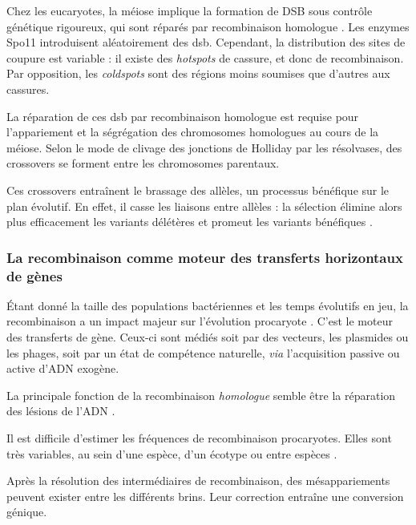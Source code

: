 \documentclass[11pt, oneside]{scrartcl}
\begin{document}
Chez les eucaryotes, la méiose implique la formation de DSB sous contrôle
génétique rigoureux, qui sont réparés par recombinaison homologue
\cite{chapman_playing_2012}. Les enzymes Spo11 introduisent aléatoirement des
\ac{dsb}. Cependant, la distribution des sites de coupure est variable : il
existe des \emph{hotspots} de cassure, et donc de recombinaison. Par opposition, les
\emph{coldspots} sont des régions moins soumises que d'autres aux cassures.

La réparation de ces \ac{dsb} par recombinaison homologue est requise pour
l'appariement et la ségrégation des chromosomes homologues au cours de la
méiose. Selon le mode de clivage des jonctions de Holliday par les résolvases,
des crossovers se forment entre les chromosomes parentaux. 

Ces crossovers entraînent le brassage des allèles, un processus bénéfique sur le
plan évolutif\cite{webster_direct_2012}. En effet, il casse les liaisons entre
allèles : la sélection élimine alors plus efficacement les variants délétères et
promeut les variants bénéfiques \cite{otto_resolving_2002}. 

\subsubsection{La recombinaison comme moteur des transferts horizontaux de gènes}
\label{sec:orgheadline5}

Étant donné la taille des populations bactériennes et les temps évolutifs en
jeu, la recombinaison a un impact majeur sur l'évolution procaryote
\cite{didelot_impact_2010}. C'est le moteur des transferts de gène. Ceux-ci sont
médiés soit par des vecteurs, les plasmides ou les phages, soit par un état de
compétence naturelle, \emph{via} l'acquisition passive ou active d'ADN exogène. 

La principale fonction de la recombinaison \emph{homologue} semble être la réparation
des lésions de l'ADN \cite{fall_horizontal_2007}. 

Il est difficile d'estimer les fréquences de recombinaison procaryotes. Elles
sont très variables, au sein d'une espèce, d'un écotype ou entre espèces
\cite{didelot_impact_2010}.


\begin{transition}
Après la résolution des intermédiaires de recombinaison, des mésappariements
peuvent exister entre les différents brins. Leur correction entraîne une
conversion génique.
\end{transition}
\end{document}
